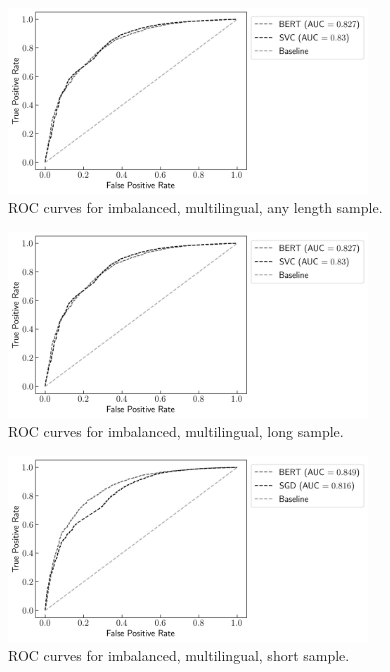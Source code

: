 \begin{figure}[!htb]
    \centering
    \includegraphics[width=0.85\textwidth]{figures/06_results/01_rfp/01_pol/02_roc/any_any_any.png}
    \caption{ROC curves for imbalanced, multilingual, any length sample.}
    \label{fig:A1_ROC_IMA}
\end{figure}

\begin{figure}[!htb]
    \centering
    \includegraphics[width=0.85\textwidth]{figures/06_results/01_rfp/01_pol/02_roc/any_any_any.png}
    \caption{ROC curves for imbalanced, multilingual, long sample.}
    \label{fig:A1_ROC_IML}
\end{figure}

\begin{figure}[!htb]
    \centering
    \includegraphics[width=0.85\textwidth]{figures/06_results/01_rfp/01_pol/02_roc/any_any_short.png}
    \caption{ROC curves for imbalanced, multilingual, short sample.}
    \label{fig:A1_ROC_IMS}
\end{figure}
